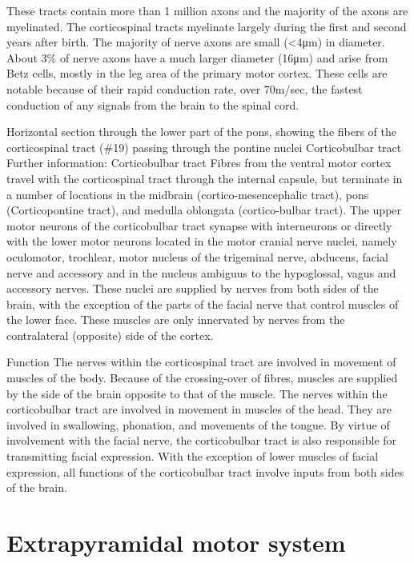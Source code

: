 These tracts contain more than 1 million axons and the majority of the axons are myelinated. The corticospinal tracts myelinate largely during the first and second years after birth. The majority of nerve axons are small (\textless{}4μm) in diameter. About 3\% of nerve axons have a much larger diameter (16μm) and arise from Betz cells, mostly in the leg area of the primary motor cortex. These cells are notable because of their rapid conduction rate, over 70m/sec, the fastest conduction of any signals from the brain to the spinal cord.

Horizontal section through the lower part of the pons, showing the fibers of the corticospinal tract (\#19) passing through the pontine nuclei
Corticobulbar tract
Further information: Corticobulbar tract
Fibres from the ventral motor cortex travel with the corticospinal tract through the internal capsule, but terminate in a number of locations in the midbrain (cortico-mesencephalic tract), pons (Corticopontine tract), and medulla oblongata (cortico-bulbar tract). The upper motor neurons of the corticobulbar tract synapse with interneurons or directly with the lower motor neurons located in the motor cranial nerve nuclei, namely oculomotor, trochlear, motor nucleus of the trigeminal nerve, abducens, facial nerve and accessory and in the nucleus ambiguus to the hypoglossal, vagus and accessory nerves. These nuclei are supplied by nerves from both sides of the brain, with the exception of the parts of the facial nerve that control muscles of the lower face. These muscles are only innervated by nerves from the contralateral (opposite) side of the cortex.

Function
The nerves within the corticospinal tract are involved in movement of muscles of the body. Because of the crossing-over of fibres, muscles are supplied by the side of the brain opposite to that of the muscle. The nerves within the corticobulbar tract are involved in movement in muscles of the head. They are involved in swallowing, phonation, and movements of the tongue. By virtue of involvement with the facial nerve, the corticobulbar tract is also responsible for transmitting facial expression. With the exception of lower muscles of facial expression, all functions of the corticobulbar tract involve inputs from both sides of the brain.

\hypertarget{extrapyramidal-motor-system}{%
\section{Extrapyramidal motor system}\label{extrapyramidal-motor-system}}

